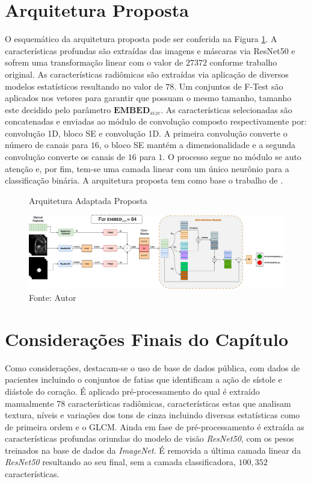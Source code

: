 \section{Arquitetura Proposta}
\label{subsec:cap4_architecture}

O esquemático da arquitetura proposta pode ser conferida na Figura \ref{fig:fig011}. A características profundas são extraídas das imagens e máscaras via ResNet50 e sofrem uma transformação linear com o valor de $27372$ conforme trabalho original. As características radiômicas são extraídas via aplicação de diversos modelos estatísticos resultando no valor de $78$. Um conjuntos de F-Test são aplicados nos vetores para garantir que possuam o mesmo tamanho, tamanho este decidido pelo parâmetro $\textbf{EMBED}_{size}$. As características selecionadas são concatenadas e enviadas ao módulo de convolução composto respectivamente por: convolução 1D, bloco \gls{SE} e convolução 1D. A primeira convolução converte o número de canais para $16$, o bloco \gls{SE} mantém a dimensionalidade e a segunda convolução converte os canais de $16$ para $1$. O processo segue no módulo se auto atenção e, por fim, tem-se uma camada linear com um único neurônio para a classificação binária. A arquitetura proposta tem como base o trabalho de \cite{aiSelfAttentionBasedFusion2023}.

\begin{figure}[htbp]
    \centering
    \caption{Arquitetura Adaptada Proposta}
    \includegraphics[scale=0.26]{figures/fig011.png}
    \caption*{Fonte: Autor}
    \label{fig:fig011}
\end{figure}

\section{Considerações Finais do Capítulo}
\label{sec:cap4_consideracoes_finais}

Como considerações, destacam-se o uso de base de dados pública, com dados de pacientes incluindo o conjuntos de fatias que identificam a ação de sístole e diástole do coração. É aplicado pré-processamento do qual é extraído manualmente 78 características radiômicas, características estas que analisam textura, níveis e variações dos tons de cinza incluindo diversas estatísticas como de primeira ordem e o \gls{GLCM}. Ainda em fase de pré-processamento é extraída as características profundas oriundas do modelo de visão \textit{ResNet50}, com os pesos treinados na base de dados da \textit{ImageNet}. É removida a última camada linear da \textit{ResNet50} resultando ao seu final, sem a camada classificadora, $100,352$ características. 

